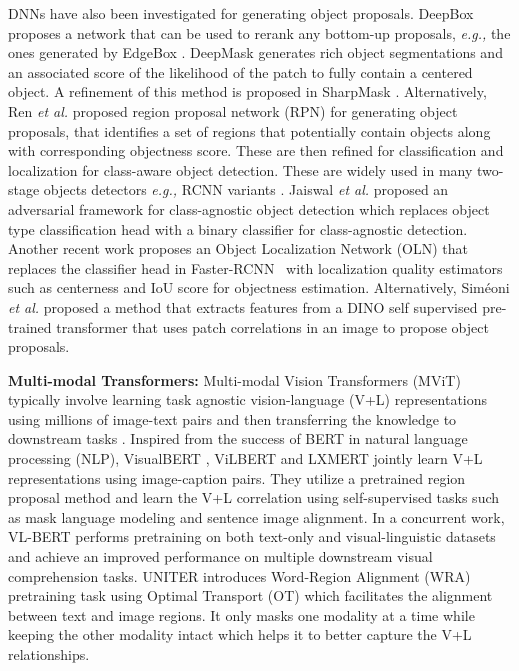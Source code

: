 \documentclass[runningheads]{llncs}
\def\eg{\emph{e.g.,}\xspace} \def\Eg{\emph{E.g.}\xspace}
\def\etal{\emph{et al.}\xspace}
\begin{document}
DNNs have also been investigated for generating object proposals. DeepBox \cite{kuo2015deepbox} proposes a network that can be used to rerank any bottom-up proposals, \eg the ones generated by EdgeBox \cite{zitnick2014edge}. DeepMask \cite{pinheiro2015learning} generates rich object segmentations and an associated score of the likelihood of the patch to fully contain a centered object. A refinement of this method is proposed in SharpMask \cite{pinheiro2016learning}. Alternatively, Ren \etal proposed region proposal network (RPN) \cite{ren2015faster} for generating object proposals, that identifies a set of regions that potentially contain objects along with corresponding objectness score. These are then refined for classification and localization for class-aware object detection. These are widely used in many two-stage objects detectors \eg RCNN variants  \cite{ren2015faster,he2017mask,lin2017feature}. Jaiswal \etal proposed an adversarial framework \cite{jaiswal2021class} for class-agnostic object detection which replaces object type classification head with a binary classifier for class-agnostic detection. 
Another recent work proposes an Object Localization Network (OLN) \cite{kim2021learning} that replaces the classifier head in Faster-RCNN~\cite{ren2015faster}  with localization quality estimators such as centerness and IoU score for objectness estimation. 
Alternatively, Sim{\'e}oni \etal proposed a method \cite{simeoni2021localizing} that extracts features from a DINO \cite{caron2021emerging} self supervised pre-trained transformer that uses patch correlations in an image to propose object proposals.  

\noindent \textbf{Multi-modal Transformers:} Multi-modal Vision Transformers (MViT) typically involve learning task agnostic vision-language (V+L) representations using millions of image-text pairs and then transferring the knowledge to downstream tasks \cite{OSCAR,UNITER,mdetr}. Inspired from the success of BERT \cite{BERT} in natural language processing (NLP), VisualBERT \cite{VisualBERT}, ViLBERT \cite{ViLBERT} and LXMERT \cite{LXMERT} jointly learn V+L representations using image-caption pairs. They utilize a pretrained region proposal method \cite{ren2015faster} and learn the V+L correlation using self-supervised tasks such as mask language modeling and sentence image alignment. 
In a concurrent work, VL-BERT \cite{VL-BERT} performs pretraining on both text-only and visual-linguistic datasets and achieve an improved performance on multiple downstream visual comprehension tasks. UNITER \cite{UNITER} introduces Word-Region Alignment (WRA) pretraining task using Optimal Transport (OT) \cite{OT} which facilitates the alignment between text and image regions. It only masks one modality at a time while keeping the other modality intact which helps it to better capture the V+L relationships. 
\end{document}
